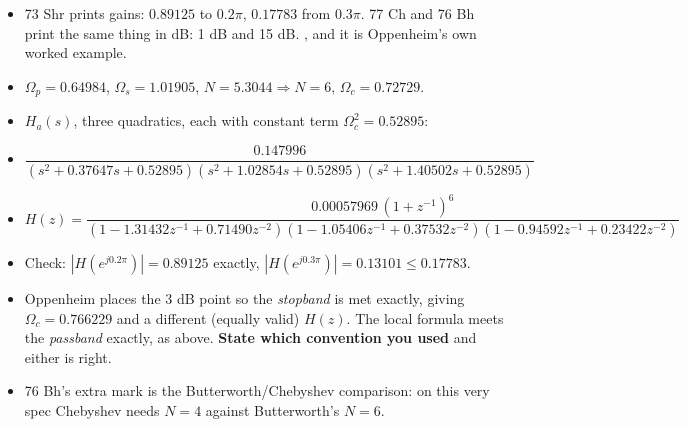 \begin{itemize}
  \item 73 Shr prints gains: $0.89125$ to $0.2\pi$, $0.17783$ from $0.3\pi$.
        77 Ch and 76 Bh print the same thing in dB: 1 dB and 15 dB. , and it is Oppenheim's own worked example.
  \item $\Omega_p=0.64984$, $\Omega_s=1.01905$, $N=5.3044\Rightarrow\boxed{N=6}$,
        $\Omega_c=0.72729$.
  \item $H_a(s)$, three quadratics, each with constant term $\Omega_c^2=0.52895$:
  \item[] \[ \frac{0.147996}
             {(s^2+0.37647s+0.52895)(s^2+1.02854s+0.52895)(s^2+1.40502s+0.52895)} \]
  \item[] \[ H(z)=\frac{0.00057969\,(1+z^{-1})^6}
             {(1-1.31432z^{-1}+0.71490z^{-2})(1-1.05406z^{-1}+0.37532z^{-2})
              (1-0.94592z^{-1}+0.23422z^{-2})} \]
  \item Check: $|H(e^{j0.2\pi})|=0.89125$ exactly, $|H(e^{j0.3\pi})|=0.13101\le0.17783$.
        \checkmark
  \item {} Oppenheim places the 3 dB point so the
        \emph{stopband} is met exactly, giving $\Omega_c=0.766229$ and a different
        (equally valid) $H(z)$. The local formula meets the \emph{passband} exactly, as
        above. \textbf{State which convention you used} and either is right.
  \item 76 Bh's extra mark is the Butterworth/Chebyshev comparison: on this very spec
        Chebyshev needs $N=4$ against Butterworth's $N=6$.
\end{itemize}

{\color{sub}\footnotesize {} }

